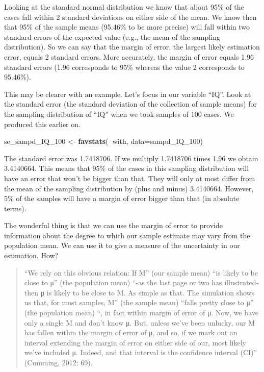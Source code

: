 \documentclass[]{book}
\newenvironment{Shaded}{\begin{snugshade}}{\end{snugshade}}
\newcommand{\DataTypeTok}[1]{\textcolor[rgb]{0.13,0.29,0.53}{#1}}
\newcommand{\DecValTok}[1]{\textcolor[rgb]{0.00,0.00,0.81}{#1}}
\newcommand{\KeywordTok}[1]{\textcolor[rgb]{0.13,0.29,0.53}{\textbf{#1}}}
\newcommand{\NormalTok}[1]{#1}
\newcommand{\OperatorTok}[1]{\textcolor[rgb]{0.81,0.36,0.00}{\textbf{#1}}}
\newcommand{\StringTok}[1]{\textcolor[rgb]{0.31,0.60,0.02}{#1}}
\theoremstyle{definition}
\theoremstyle{definition}
\theoremstyle{definition}
\theoremstyle{remark}
\begin{document}
Looking at the standard normal distribution we know that about 95\% of
the cases fall within 2 standard deviations on either side of the mean.
We know then that 95\% of the sample means (95.46\% to be more precise)
will fall within two standard errors of the expected value (e.g., the
mean of the sampling distribution). So we can say that the margin of
error, the largest likely estimation error, equals 2 standard errors.
More accurately, the margin of error equals 1.96 standard errors (1.96
corresponds to 95\% whereas the value 2 corresponds to 95.46\%).

This may be clearer with an example. Let's focus in our variable ``IQ''.
Look at the standard error (the standard deviation of the collection of
sample means) for the sampling distribution of ``IQ'' when we took
samples of 100 cases. We produced this earlier on.

\begin{Shaded}
\begin{Highlighting}[]
\NormalTok{se_sampd_IQ_}\DecValTok{100}\NormalTok{ <-}\StringTok{ }\KeywordTok{favstats}\NormalTok{(}\OperatorTok{~}\NormalTok{with, }\DataTypeTok{data=}\NormalTok{sampd_IQ_}\DecValTok{100}\NormalTok{)}
\end{Highlighting}
\end{Shaded}

The standard error was 1.7418706. If we multiply 1.7418706 times 1.96 we
obtain 3.4140664. This means that 95\% of the cases in this sampling
distribution will have an error that won't be bigger than that. They
will only at most differ from the mean of the sampling distribution by
(plus and minus) 3.4140664. However, 5\% of the samples will have a
margin of error bigger than that (in absolute terms).

The wonderful thing is that we can use the margin of error to provide
information about the degree to which our sample estimate may vary from
the population mean. We can use it to give a measure of the uncertainty
in our estimation. How?

\begin{quote}
``We rely on this obvious relation: If M'' (our sample mean) ``is likely
to be close to μ'' (the population mean) ``-as the last page or two has
illustrated- then μ is likely to be close to M. As simple as that. The
simulation shows us that, for most samples, M'' (the sample mean)
``falls pretty close to μ'' (the population mean) ``, in fact within
margin of error of μ. Now, we have only a single M and don't know μ.
But, unless we've been unlucky, our M has fallen within the margin of
error of μ, and so, if we mark out an interval extending the margin of
error on either side of our, most likely we've included μ. Indeed, and
that interval is the confidence interval (CI)'' (Cumming, 2012: 69).
\end{quote}
\end{document}
